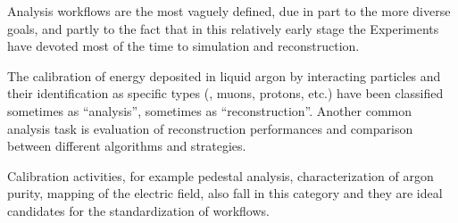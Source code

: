 Analysis workflows are the most vaguely defined,
due in part to the more diverse goals,
and partly to the fact that in this relatively early stage the Experiments
have devoted most of the time to simulation and reconstruction.

The calibration of energy deposited in liquid argon by interacting particles
and their identification as specific types (\eg, muons, protons, etc.)
have been classified sometimes as ``analysis'', sometimes as ``reconstruction''.
Another common analysis task is evaluation of reconstruction performances
and comparison between different algorithms and strategies.

Calibration activities, for example pedestal analysis,
characterization of argon purity, mapping of the electric field,
also fall in this category and they are ideal candidates for the standardization of workflows.
